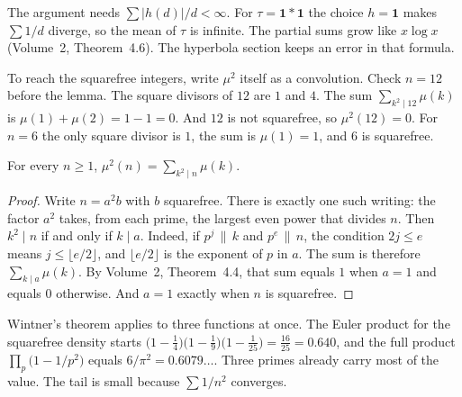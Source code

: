 The argument needs $\sum|h(d)|/d<\infty$. For $\tau=\mathbf1*\mathbf1$ the choice $h=\mathbf1$ makes $\sum 1/d$ diverge, so the mean of $\tau$ is infinite. The partial sums grow like $x\log x$ (Volume~2, Theorem~4.6). The hyperbola section keeps an error in that formula.

To reach the squarefree integers, write $\mu^2$ itself as a convolution. Check $n=12$ before the lemma. The square divisors of $12$ are $1$ and $4$. The sum $\sum_{k^2\mid12}\mu(k)$ is $\mu(1)+\mu(2)=1-1=0$. And $12$ is not squarefree, so $\mu^2(12)=0$. For $n=6$ the only square divisor is $1$, the sum is $\mu(1)=1$, and $6$ is squarefree.

\begin{lemma}\label{lem:mu2}
For every $n\ge1$, $\mu^2(n)=\sum_{k^2\mid n}\mu(k)$.
\end{lemma}
\begin{proof}
Write $n=a^2b$ with $b$ squarefree. There is exactly one such writing: the factor $a^2$ takes, from each prime, the largest even power that divides $n$. Then $k^2\mid n$ if and only if $k\mid a$. Indeed, if $p^j\,\|\,k$ and $p^e\,\|\,n$, the condition $2j\le e$ means $j\le\lfloor e/2\rfloor$, and $\lfloor e/2\rfloor$ is the exponent of $p$ in $a$. The sum is therefore $\sum_{k\mid a}\mu(k)$. By Volume~2, Theorem~4.4, that sum equals $1$ when $a=1$ and equals $0$ otherwise. And $a=1$ exactly when $n$ is squarefree.
\end{proof}

Wintner's theorem applies to three functions at once. The Euler product for the squarefree density starts $\bigl(1-\frac14\bigr)\bigl(1-\frac19\bigr)\bigl(1-\frac1{25}\bigr)=\frac{16}{25}=0.640$, and the full product $\prod_p\bigl(1-1/p^2\bigr)$ equals $6/\pi^2=0.6079\ldots$. Three primes already carry most of the value. The tail is small because $\sum 1/n^2$ converges.

